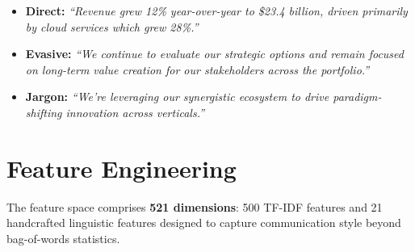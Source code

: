 \documentclass[12pt]{article}
\begin{document}
\begin{itemize}[nosep]
    \item \textbf{Direct:} \emph{``Revenue grew 12\% year-over-year to
          \$23.4 billion, driven primarily by cloud services which grew
          28\%.''}
    \item \textbf{Evasive:} \emph{``We continue to evaluate our strategic
          options and remain focused on long-term value creation for our
          stakeholders across the portfolio.''}
    \item \textbf{Jargon:} \emph{``We're leveraging our synergistic
          ecosystem to drive paradigm-shifting innovation across
          verticals.''}
\end{itemize}

\section{Feature Engineering}
\label{sec:features}

The feature space comprises \textbf{521 dimensions}: 500 TF-IDF features and
21 handcrafted linguistic features designed to capture communication style
beyond bag-of-words statistics.
\end{document}
